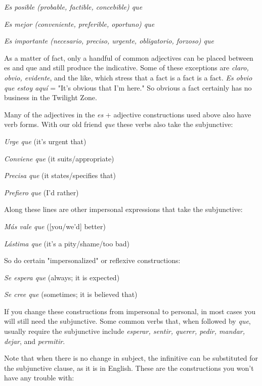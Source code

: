 \documentclass[14pt,a4paper,oneside]{memoir}
\newcommand{\bsk}{\vspace{20pt}}
\newcommand{\indu}{\hspace{20pt}}
\begin{document}
\bsk

\indu \emph{Es posible (probable, factible, concebible) que}

\indu \emph{Es mejor (conveniente, preferible, oportuno) que}

\indu \emph{Es importante (necesario, preciso, urgente, obligatorio,
forzoso) que}

\bsk

As a matter of fact, only a handful of common adjectives can
be placed between es and que and still produce the indicative. Some of
these exceptions are \emph{claro, obvio, evidente}, and the like, which stress
that a fact is a fact is a fact. \emph{Es obvio que estoy aquí} = "It's obvious
that I'm here." So obvious a fact certainly has no business in the Twilight Zone.

Many of the adjectives in the \emph{es} + adjective constructions
used above also have verb forms. With our old friend \emph{que} these verbs
also take the subjunctive:

\bsk

\indu \emph{Urge que} (it's urgent that)

\indu \emph{Conviene que} (it suits/appropriate)

\indu \emph{Precisa que} (it states/specifies that)

\indu \emph{Prefiero que} (I'd rather)

\bsk

Along these lines are other impersonal expressions that take
the subjunctive:

\bsk

\indu \emph{Más vale que} ([you/we'd] better)

\indu \emph{Lástima que} (it's a pity/shame/too bad)

\bsk

So do certain "impersonalized" or reflexive constructions:

\bsk

\indu \emph{Se espera que} (always; it is expected)

\indu \emph{Se cree que} (sometimes; it is believed that)

\bsk

If you change these constructions from impersonal to personal, in
most cases you will still need the subjunctive. Some common verbs
that, when followed by \emph{que}, usually require the subjunctive include
\emph{esperar, sentir, querer, pedir, mandar, dejar}, and \emph{permitir}.

Note that when there is no change in subject, the infinitive
can be substituted for the subjunctive clause, as it is in English. These
are the constructions you won't have any trouble with:
\end{document}
